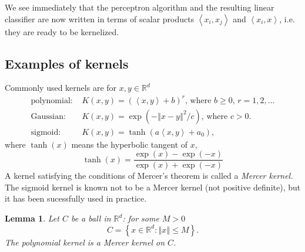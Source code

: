\documentclass[11pt,twoside]{article}%
\theoremstyle{change}
\newtheorem{lemma}[theorem]{Lemma}
\begin{document}
We see immediately that the perceptron algorithm and the resulting linear
classifier are now written in terms of scalar products $\left\langle
x_{i},x_{j}\right\rangle $ and $\left\langle x_{i},x\right\rangle $, i.e. they
are ready to be kernelized.

\subsection{Examples of kernels}

Commonly used kernels are for $x,y\in\mathbb{R}^{d}$
\begin{align}
\text{polynomial}\text{: }  & K(x,y)=\left(  \left\langle x,y\right\rangle
+b\right)  ^{r}\text{, where }b\geq0\text{, }r=1,2,\ldots\label{kern-poly}\\
\text{Gaussian}\text{: }  & K(x,y)=\exp\left(  -\left\Vert x-y\right\Vert
^{2}/c\right)  \text{, where }c>0\text{.}\label{kern-gauss}\\
\text{sigmoid}\text{: }  & K(x,y)=\tanh\left(  a\left\langle x,y\right\rangle
+a_{0}\right)  \text{, }%
\end{align}
where $\tanh(x)$ means the hyperbolic tangent of $x$,
\[
\tanh(x)=\frac{\exp(x)-\exp(-x)}{\exp(x)+\exp(-x)}%
\]
A kernel satisfying the conditions of Mercer's theorem is called a
\textit{Mercer kernel. }The sigmoid kernel is known not to be a Mercer kernel
(not positive definite), but it has been sucessfully used in practice.

\begin{lemma}
Let $C$ be a ball in $\mathbb{R}^{d}$: for some $M>0$%
\[
C=\left\{  x\in\mathbb{R}^{d}:\left\Vert x\right\Vert \leq M\right\}  .
\]
The polynomial kernel is a Mercer kernel on $C$.
\end{lemma}
\end{document}
